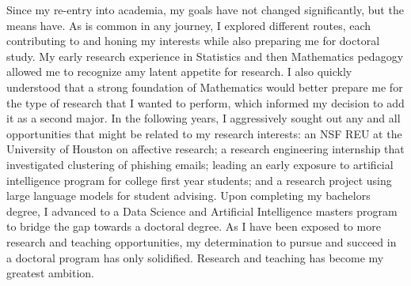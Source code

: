 \documentclass[12pt]{article}
\begin{document}
Since my re-entry into academia, my goals have not changed significantly, but the means have. As is common in any journey, I explored
different routes, each contributing to and honing my interests while also preparing me for doctoral study.  My early research experience in
Statistics and then Mathematics pedagogy allowed me to recognize amy latent appetite for research.  I also quickly understood that a strong
foundation of Mathematics would better prepare me for the type of research that I wanted to perform, which informed my decision to add it as
a second major.  In the following years, I aggressively sought out any and all opportunities that might be related to my research
interests: an NSF REU at the University of Houston on affective research; a research engineering internship that investigated clustering of
phishing emails; leading an early exposure to artificial intelligence program for college first year students; and a research project using
large language models for student advising.  Upon completing my bachelors degree, I advanced to a Data Science and Artificial Intelligence
masters program to bridge the gap towards a doctoral degree.  As I have been exposed to more research and teaching opportunities, my
determination to pursue and succeed in a doctoral program has only solidified.  Research and teaching has become my greatest ambition.
\end{document}
